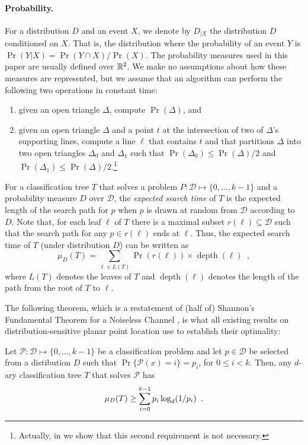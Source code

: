 \documentclass[charterfonts,lotsofwhite]{patmorin}
\DeclareMathOperator{\depth}{depth}
\begin{document}
\paragraph{Probability.}

For a distribution $D$ and an event $X$, we denote by $D_{|X}$ the
distribution $D$ conditioned on $X$.  That is, the distribution where
the probability of an event $Y$ is $\Pr(Y|X)=\Pr(Y\cap X)/\Pr(X)$.
The probability measures used in this paper are usually defined over
$\mathbb{R}^2$.  We make no assumptions about how these measures are
represented, but we assume that an algorithm can perform the following
two operations in constant time:
\begin{enumerate}
\item given an open triangle $\Delta$, compute $\Pr(\Delta)$, and
\item given an open triangle $\Delta$ and a point $t$ at the
intersection of two of $\Delta$'s supporting lines, compute a line $\ell$
that contains $t$ and that partitions $\Delta$ into two open triangles
$\Delta_0$ and $\Delta_1$ such that $\Pr(\Delta_0)\le\Pr(\Delta)/2$
and $\Pr(\Delta_1)\le\Pr(\Delta)/2$.\footnote{Actually, in
 we show that this second requirement is not
necessary.}
\end{enumerate}

For a classification tree $T$ that solves a problem
$P:\mathcal{D}\mapsto\{0,\ldots,k-1\}$ and a probability measure $D$
over $\mathcal{D}$, the \emph{expected search time} of $T$ is the
expected length of the search path for $p$ when $p$ is drawn at random
from $\mathcal{D}$ according to $D$.  Note that, for each leaf $\ell$
of $T$ there is a maximal subset $r(\ell)\subseteq \mathcal{D}$ such
that the search path for any $p\in r(\ell)$ ends at $\ell$.  Thus, the
expected search time of $T$ (under distribution $D$) can be written as
\[
     \mu_D(T) = \sum_{\ell\in L(T)} \Pr(r(\ell))\times \depth(\ell)
	\enspace ,
\]
where $L(T)$ denotes the leaves of $T$ and $\depth(\ell)$ denotes the
length of the path from the root of $T$ to $\ell$.

The following theorem, which is a restatement of (half of) Shannon's
Fundamental Theorem for a Noiseless Channel \cite[Theorem 9]{s48}, is
what all existing results on distribution-sensitive planar point
location use to establish their optimality:

\setcounter{thm}{8}
\begin{thm}
Let $\mathcal{P}:\mathcal{D}\mapsto \{0,\ldots,k-1\}$ be a classification
problem and let $p\in \mathcal{D}$ be selected from a distibution $D$ such
that $\Pr\{\mathcal{P}(x)= i\}=p_i$, for $0\le i< k$.  Then, any
$d$-ary classification tree $T$ that solves $\mathcal{P}$ has
\begin{equation}
     \mu_D(T) \ge \sum_{i=0}^{k-1} p_i\log_d(1/p_i) \enspace .
	\eqlabel{shannon}
\end{equation}
\end{thm}
\setcounter{thm}{0}
\end{document}
